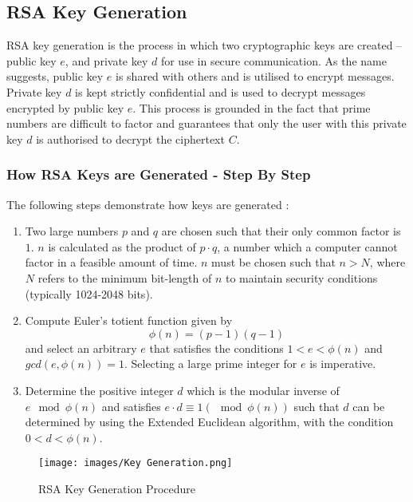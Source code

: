 \documentclass{article}
\begin{document}
\subsection{RSA Key Generation}
RSA key generation is the process in which two cryptographic keys are created – public key $e$, and private key $d$ for use in secure communication. As the name suggests, public key $e$ is shared with others and is utilised to encrypt messages. Private key $d$ is kept strictly confidential and is used to decrypt messages encrypted by public key $e$. This process is grounded in the fact that prime numbers are difficult to factor and guarantees that only the user with this private key $d$ is authorised to decrypt the ciphertext $C$.

\subsubsection{How RSA Keys are Generated - Step By Step}
The following steps demonstrate how keys are generated \cite{keygeneration}:
\begin{enumerate}
    \item Two large numbers $p$ and $q$ are chosen such that their only common factor is $1$. $n$ is calculated as the product of $p\cdot q$, a number which a computer cannot factor in a feasible amount of time. $n$ must be chosen such that $n > N$, where $N$ refers to the minimum bit-length of $n$ to maintain security conditions (typically 1024-2048 bits). 
    \item Compute Euler's totient function given by 
\begin{equation}
 \phi (n) = (p-1)(q-1)
\end{equation}
    and select an arbitrary $e$ that satisfies the conditions $1 < e < \phi (n)$ and $gcd (e, \phi(n)) = 1$. Selecting a large prime integer for $e$ is imperative.
    \item Determine the positive integer $d$ which is the modular inverse of $e\mod \phi (n)$ and satisfies $e\cdot d \equiv 1 (\mod \phi(n))$ such that $d$ can be determined by using the Extended Euclidean algorithm, with the condition $0 < d < \phi(n)$. 
\end{enumerate}

\begin{figure} [H]
    \centering
    \texttt{[image: images/Key Generation.png]}
    \caption{RSA Key Generation Procedure}
\end{figure}
\end{document}
